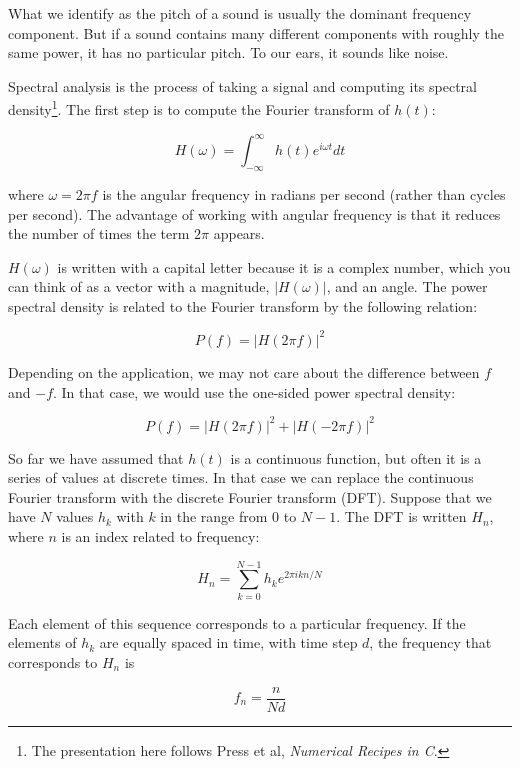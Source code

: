 \documentclass[10pt]{book}
\begin{document}
What we identify as the pitch of a sound is usually the dominant
frequency component.  But if a sound contains many different
components with roughly the same power, it has no particular pitch.
To our ears, it sounds like noise.

Spectral analysis is the process of taking a signal and computing its
spectral density\footnote{The presentation here follows Press et al,
  {\em Numerical Recipes in C}.}.  The first step is to compute the
  Fourier transform of $h(t)$:

\[ H(\omega) = \int_{-\infty}^{\infty} h(t) e^{i \omega t} dt \]

where $\omega = 2 \pi f$ is the angular frequency in
radians per second (rather than cycles per second).  The advantage
of working with angular frequency is that it reduces the number
of times the term $2 \pi$ appears.

$H(\omega)$ is written with a capital letter because it is a complex
number, which you can think of as a vector with a magnitude,
$|H(\omega)|$, and an angle.  The power spectral density is related to
the Fourier transform by the following relation:

\[ P(f) = |H(2 \pi f)|^2 \]

Depending on the application, we may not care about the difference
between $f$ and $-f$.  In that case, we would use the one-sided
power spectral density:

\[ P(f) = |H(2 \pi f)|^2 + |H(-2 \pi f)|^2 \]

So far we have assumed that $h(t)$ is a continuous function, but
often it is a series of values at discrete times.  In that
case we can replace the continuous Fourier transform with
the discrete Fourier transform (DFT).  Suppose that we have
$N$ values $h_k$ with $k$ in the range from 0 to $N-1$.  The
DFT is written $H_n$, where $n$ is an index related to frequency:

\begin{equation}
\label{dft}
H_n = \sum_{k=0}^{N-1} h_k e^{2 \pi i k n / N}
\end{equation}

Each element of this sequence corresponds to a particular frequency.
If the elements of $h_k$ are equally spaced in time, with time
step $d$, the frequency that corresponds to $H_n$ is

\[ f_n = \frac{n}{N d} \]
\end{document}
